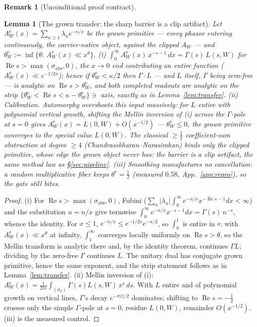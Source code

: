 \documentclass[11pt]{article}
\newtheorem{lemma}[theorem]{Lemma}
\theoremstyle{definition}
\newtheorem{remark}[theorem]{Remark}
\renewcommand{\Re}{\operatorname{Re}}
\begin{document}
\begin{remark}[Unconditional proof contract]
\begin{enumerate}
\begin{lemma}[The grown transfer: the sharp barrier is a clip artifact]\label{lem:growntransfer}
Let $A^{\mathrm e}_W(x)=\sum_{n\ge1}\lambda_n e^{-n/x}$ be the \emph{grown} primitive --- every phasor
entering continuously, the carrier-native object, against the clipped $A_W$ --- and
$\theta^{\mathrm e}_W:=\inf\{\theta:\ A^{\mathrm e}_W(x)\ll x^{\theta}\}$.
\textup{(i)} $\int_0^\infty A^{\mathrm e}_W(x)\,x^{-s-1}\,dx=\Gamma(s)\,L(s,W)$ for
$\Re s>\max(\sigma_{\mathrm{abs}},0)$, the $x\to0$ end contributing an entire function
($A^{\mathrm e}_W(x)\ll e^{-1/2x}$); hence if $\theta^{\mathrm e}_W<\kappa/2$ then $\Gamma\cdot L$ ---
and $L$ itself, $\Gamma$ being zero-free --- is analytic on $\Re s>\theta^{\mathrm e}_W$, and both completed
readouts are analytic on the strip $\{\theta^{\mathrm e}_W<\Re s<\kappa-\theta^{\mathrm e}_W\}\ni$ axis,
exactly as in Lemma~\ref{lem:transfer}.
\textup{(ii)} \emph{Calibration.} Automorphy overshoots this input massively: for $L$ entire with
polynomial vertical growth, shifting the Mellin inversion of \textup{(i)} across the $\Gamma$-pole at $s=0$
gives $A^{\mathrm e}_W(x)=L(0,W)+O(x^{-1/2})$ --- $\theta^{\mathrm e}_W\le0$, the grown primitive
\emph{converges to the special value} $L(0,W)$. The classical $\ge\tfrac12$ coefficient-sum obstruction at
degree $\ge4$ (Chandrasekharan--Narasimhan) binds only the \emph{clipped} primitive, whose edge the grown
object never has: the barrier is a clip artifact, the same method law as \S\ref{sec:pipeline}.
\textup{(iii)} Smoothing manufactures no cancellation: a random multiplicative fiber keeps
$\theta^{\mathrm e}=\tfrac12$ (measured $0.58$, App.~\ref{app:repro}), so the gate still bites.
\end{lemma}
\begin{proof}
\textup{(i)} For $\Re s>\max(\sigma_{\mathrm{abs}},0)$, Fubini
($\sum_n|\lambda_n|\int_0^\infty e^{-n/x}x^{-\Re s-1}dx<\infty$) and the substitution $u=n/x$ give termwise
$\int_0^\infty e^{-n/x}x^{-s-1}dx=\Gamma(s)\,n^{-s}$, whence the identity. For $x\le1$,
$e^{-n/x}\le e^{-1/2x}e^{-n/2}$, so $\int_0^1$ is entire in $s$; with $A^{\mathrm e}_W(x)\ll x^{\theta}$ at
infinity, $\int_1^\infty$ converges locally uniformly on $\Re s>\theta$, so the Mellin transform is analytic
there and, by the identity theorem, continues $\Gamma L$; dividing by the zero-free $\Gamma$ continues $L$.
The unitary dual has conjugate grown primitive, hence the same exponent, and the strip statement follows as
in Lemma~\ref{lem:transfer}.
\textup{(ii)} Mellin inversion of \textup{(i)}: $A^{\mathrm e}_W(x)=\frac1{2\pi i}\int_{(\sigma_0)}
\Gamma(s)L(s,W)\,x^{s}\,ds$. With $L$ entire and of polynomial growth on vertical lines, $\Gamma$'s decay
$e^{-\pi|t|/2}$ dominates; shifting to $\Re s=-\tfrac12$ crosses only the simple $\Gamma$-pole at $s=0$,
residue $L(0,W)$, remainder $O(x^{-1/2})$.
\textup{(iii)} is the measured control.
\end{proof}


\end{enumerate}
\end{remark}
\end{document}
